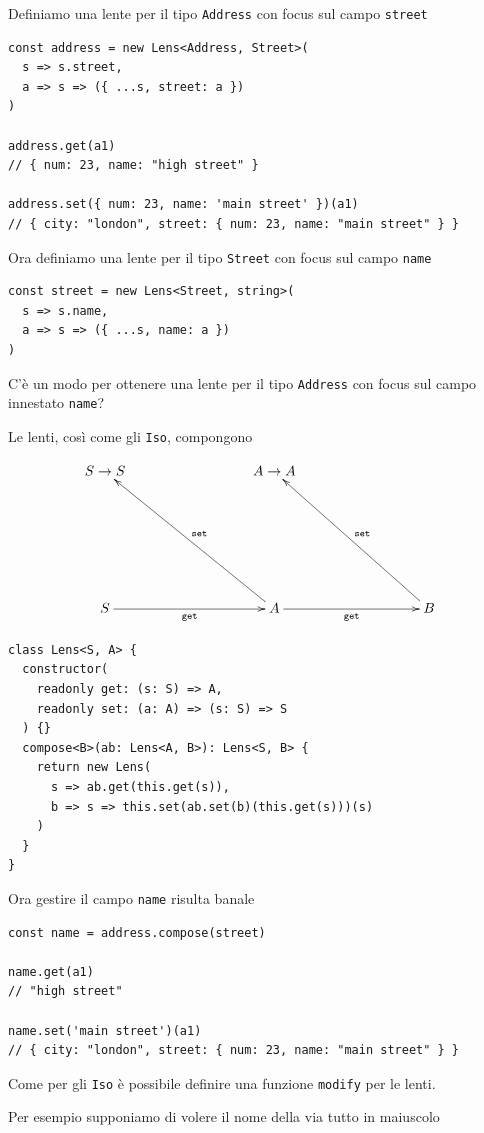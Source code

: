 \documentclass[12pt]{article}
\begin{document}
Definiamo una lente per il tipo \texttt{Address} con focus sul campo \texttt{street}

\begin{verbatim}
const address = new Lens<Address, Street>(
  s => s.street,
  a => s => ({ ...s, street: a })
)

address.get(a1)
// { num: 23, name: "high street" }

address.set({ num: 23, name: 'main street' })(a1)
// { city: "london", street: { num: 23, name: "main street" } }
\end{verbatim}

Ora definiamo una lente per il tipo \texttt{Street} con focus sul campo \texttt{name}

\begin{verbatim}
const street = new Lens<Street, string>(
  s => s.name,
  a => s => ({ ...s, name: a })
)
\end{verbatim}

C'è un modo per ottenere una lente per il tipo \texttt{Address} con focus sul campo innestato \texttt{name}?

Le lenti, così come gli \texttt{Iso}, compongono

\[
\xymatrixrowsep{3cm}
\xymatrixcolsep{3cm}
\xymatrix{
  {S \rightarrow S} & {A \rightarrow A} \\
  S \ar[r]_{\texttt{get}} & A \ar[lu]_{\texttt{set}} \ar[r]_{\texttt{get}} & B \ar[lu]_{\texttt{set}}
}
\]

\begin{verbatim}
class Lens<S, A> {
  constructor(
    readonly get: (s: S) => A,
    readonly set: (a: A) => (s: S) => S
  ) {}
  compose<B>(ab: Lens<A, B>): Lens<S, B> {
    return new Lens(
      s => ab.get(this.get(s)),
      b => s => this.set(ab.set(b)(this.get(s)))(s)
    )
  }
}
\end{verbatim}

Ora gestire il campo \texttt{name} risulta banale

\begin{verbatim}
const name = address.compose(street)

name.get(a1)
// "high street"

name.set('main street')(a1)
// { city: "london", street: { num: 23, name: "main street" } }
\end{verbatim}

Come per gli \texttt{Iso} è possibile definire una funzione \texttt{modify} per le lenti.

Per esempio supponiamo di volere il nome della via tutto in maiuscolo
\end{document}
